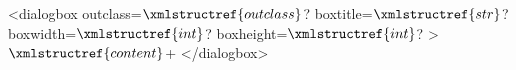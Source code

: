 <dialogbox outclass=$\xmlstructref{outclass}$? boxtitle=$\xmlstructref{str}$? boxwidth=$\xmlstructref{int}$? boxheight=$\xmlstructref{int}$? >
  $\xmlstructref{content}$+
</dialogbox>
